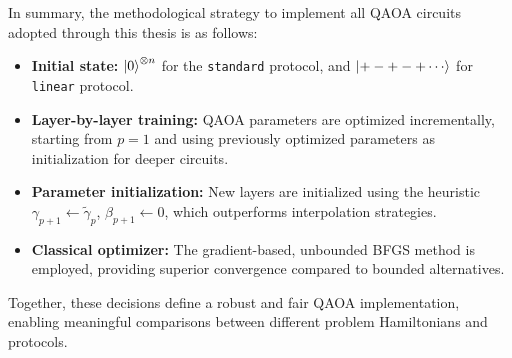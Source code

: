 
\pagebreak

In summary, the methodological strategy to implement all QAOA circuits adopted through this thesis is as follows:
\begin{itemize}
    \item \textbf{Initial state:} $\ket{0}^{\otimes n}$ for the \texttt{standard} protocol, and $\ket{+-+-+\cdots}$ for \texttt{linear} protocol. 
    \item \textbf{Layer-by-layer training:} QAOA parameters are optimized incrementally, starting from $p=1$ and using previously optimized parameters as initialization for deeper circuits.  
    \item \textbf{Parameter initialization:} New layers are initialized using the heuristic $\gamma_{p+1} \leftarrow \widetilde{\gamma}_p$, $\beta_{p+1} \leftarrow 0$, which outperforms interpolation strategies.  
    \item \textbf{Classical optimizer:} The gradient-based, unbounded BFGS method is employed, providing superior convergence compared to bounded alternatives.  
\end{itemize}

Together, these decisions define a robust and fair QAOA implementation, enabling meaningful comparisons between different problem Hamiltonians and protocols.